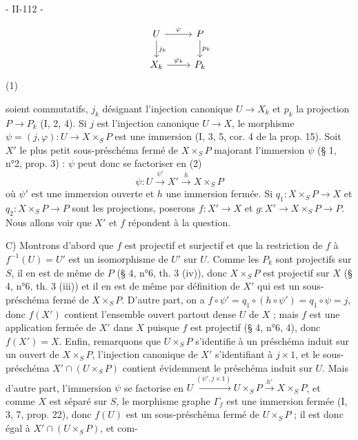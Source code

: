 \newpage


- II-112 -

$$
\begin{tikzcd}
U \arrow[r, "\varphi"] \arrow[d, "j_k"] & P \arrow[d, "p_k"] \\
X_k \arrow[r, "\varphi_k"] & P_k
\end{tikzcd}
$$
(1)

soient commutatifs, $j_k$ désignant l'injection canonique $U \to X_k$ et $p_k$ la projection $P \to P_k$ (I, 2, 4). Si $j$ est l'injection canonique $U \to X$, le morphisme $\psi = (j, \varphi) : U \to X \times_S P$ est une immersion (I, 3, 5, cor. 4 de la prop. 15). Soit $X'$ le plus petit sous-préschéma fermé de $X \times_S P$ majorant l'immersion $\psi$ (§ 1, n°2, prop. 3) : $\psi$ peut donc se factoriser en
(2)
$$ \psi : U \xrightarrow{\psi'} X' \xrightarrow{h} X \times_S P $$
où $\psi'$ est une immersion ouverte et $h$ une immersion fermée. Si $q_1 : X \times_S P \to X$ et $q_2 : X \times_S P \to P$ sont les projections, poserons $f : X' \to X$ et $g : X' \to X \times_S P \to P$. Nous allons voir que $X'$ et $f$ répondent à la question.

C) Montrons d'abord que $f$ est projectif et surjectif et que la restriction de $f$ à $f^{-1}(U) = U'$ est un isomorphisme de $U'$ sur $U$. Comme les $P_k$ sont projectifs sur $S$, il en est de même de $P$ (§ 4, n°6, th. 3 (iv)), donc $X \times_S P$ est projectif sur $X$ (§ 4, n°6, th. 3 (iii)) et il en est de même par définition de $X'$ qui est un sous-préschéma fermé de $X \times_S P$. D'autre part, on a $f \circ \psi' = q_1 \circ (h \circ \psi') = q_1 \circ \psi = j$, donc $f(X')$ contient l'ensemble ouvert partout dense $U$ de $X$ ; mais $f$ est une application fermée de $X'$ dans $X$ puisque $f$ est projectif (§ 4, n°6, 4), donc $f(X') = X$. Enfin, remarquons que $U \times_S P$ s'identifie à un préschéma induit sur un ouvert de $X \times_S P$, l'injection canonique de $X'$ s'identifiant à $j \times 1$, et le sous-préschéma $X' \cap (U \times_S P)$ contient évidemment le préschéma induit sur $U$. Mais d'autre part, l'immersion $\psi$ se factorise en $U \xrightarrow{(\psi', j \times 1)} U \times_S P \xrightarrow{h'} X \times_S P$, et comme $X$ est séparé sur $S$, le morphisme graphe $\Gamma_f$ est une immersion fermée (I, 3, 7, prop. 22), donc $f(U)$ est un sous-préschéma fermé de $U \times_S P$ ; il est donc égal à $X' \cap (U \times_S P)$, et com-

\newpage

